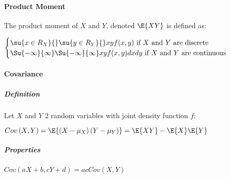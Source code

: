 \paragraph{Product Moment}
The product moment of $X$ and $Y$, denoted $\E{XY}$ is defined as:
\begin{center}
	$\begin{cases}
		\su{ {x\in R_{X}}}{}\su{ {y\in R_{Y}}}{}xyf(x,y)\text{ if }X\text{ and } Y\text{ are discrete}\\
		\Su{ {-\infty}}{\infty}\Su{ {-\infty}}{\infty}xyf(x,y)dxdy\text{ if }X\text{ and } Y\text{ are continuous}
	\end{cases}$
\end{center}
\paragraph{Covariance}
\subparagraph{Definition}
Let $X$ and $Y$ 2 random variables with joint density function $f$:
\begin{center}
	$Cov\left( X,Y \right)=\E{\left( X-\mu_{X} \right)\left( Y-\mu_{Y} \right)}= \E{XY}-\E{X}\E{Y}$
\end{center}
\subparagraph{Properties}
\begin{center}
	$Cov(aX+b, cY+d)=acCov(X,Y)$
\end{center}
